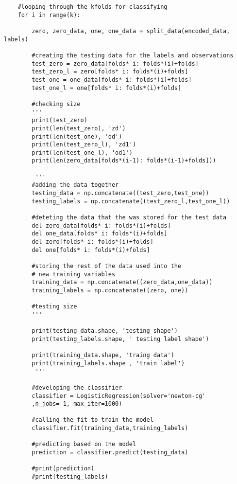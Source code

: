 \documentclass[12pt]{article}
\begin{document}
\begin{enumerate}
\begin{flushleft}
\begin{lstlisting}
    #looping through the kfolds for classifying
    for i in range(k):
    
        zero, zero_data, one, one_data = split_data(encoded_data, labels)
        
        #creating the testing data for the labels and observations
        test_zero = zero_data[folds* i: folds*(i)+folds]
        test_zero_l = zero[folds* i: folds*(i)+folds]
        test_one = one_data[folds* i: folds*(i)+folds]
        test_one_l = one[folds* i: folds*(i)+folds]
        
        #checking size
        ''' 
        print(test_zero)
        print(len(test_zero), 'zd')
        print(len(test_one), 'od')
        print(len(test_zero_l), 'zd1')
        print(len(test_one_l), 'od1')
        print(len(zero_data[folds*(i-1): folds*(i-1)+folds]))
        
         '''
        #adding the data together
        testing_data = np.concatenate((test_zero,test_one))
        testing_labels = np.concatenate((test_zero_l,test_one_l))
        
        #deteting the data that the was stored for the test data
        del zero_data[folds* i: folds*(i)+folds]
        del one_data[folds* i: folds*(i)+folds]
        del zero[folds* i: folds*(i)+folds]
        del one[folds* i: folds*(i)+folds]
        
        #storing the rest of the data used into the
        # new training variables
        training_data = np.concatenate((zero_data,one_data))
        training_labels = np.concatenate((zero, one))

        #testing size
        '''
        
        print(testing_data.shape, 'testing shape')
        print(testing_labels.shape, ' testing label shape')

        print(training_data.shape, 'traing data')
        print(training_labels.shape , 'train label')
         '''
         
        #developing the classifier
        classifier = LogisticRegression(solver='newton-cg'
        ,n_jobs=-1, max_iter=1000)
        
        #calling the fit to train the model
        classifier.fit(training_data,training_labels)
        
        #predicting based on the model
        prediction = classifier.predict(testing_data)
        
        #print(prediction)
        #print(testing_labels)


\end{lstlisting}
\end{flushleft}
\end{enumerate}
\end{document}
